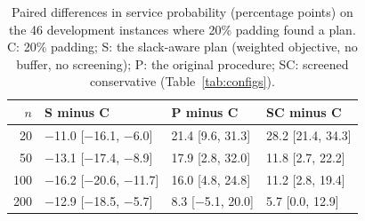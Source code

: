 \begin{table}[t]
\centering
\small
\caption{Paired differences in service probability (percentage points) on the 46 development instances where 20\% padding found a plan. C: 20\% padding; S: the slack-aware plan (weighted objective, no buffer, no screening); P: the original procedure; SC: screened conservative (Table~\ref{tab:configs}).}
\label{tab:paired}
\begin{tabular}{rlll}
\toprule
$n$ & S minus C & P minus C & SC minus C\\
\midrule
20 & $-$11.0 [$-$16.1, $-$6.0] & 21.4 [9.6, 31.3] & 28.2 [21.4, 34.3]\\
50 & $-$13.1 [$-$17.4, $-$8.9] & 17.9 [2.8, 32.0] & 11.8 [2.7, 22.2]\\
100 & $-$16.2 [$-$20.6, $-$11.7] & 16.0 [4.8, 24.8] & 11.2 [2.8, 19.4]\\
200 & $-$12.9 [$-$18.5, $-$5.7] & 8.3 [$-$5.1, 20.0] & 5.7 [0.0, 12.9]\\
\bottomrule
\end{tabular}
\end{table}
